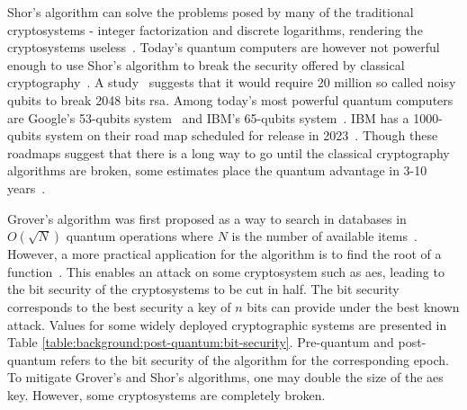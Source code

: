 Shor's algorithm can solve the problems posed by many of the traditional cryptosystems - integer factorization and discrete logarithms, rendering the cryptosystems useless~\cite{shor1997}. Today's quantum computers are however not powerful enough to use Shor's algorithm to break the security offered by classical cryptography~\cite{bernstein2017}. A study~\cite{gidney2019} suggests that it would require 20 million so called noisy \glspl{qubit} to break 2048 bits \gls{rsa}. Among today's most powerful quantum computers are Google's 53-\glspl{qubit} system~\cite{google2019:quantum-computer} and IBM's 65-\glspl{qubit} system~\cite{ibm2020:quantum-computer}. IBM has a 1000-\glspl{qubit} system on their road map scheduled for release in 2023~\cite{ibm2020:quantum-computer}. Though these roadmaps suggest that there is a long way to go until the classical cryptography algorithms are broken, some estimates place the quantum advantage in 3-10 years~\cite{ibm:z15:2019, microsoft2020}.

Grover's algorithm was first proposed as a way to search in databases in $O(\sqrt N)$ quantum operations where $N$ is the number of available items~\cite{grover1996}. However, a more practical application for the algorithm is to find the root of a function~\cite{bernstein2017}. This enables an attack on some cryptosystem such as \gls{aes}, leading to the bit security of the cryptosystems to be cut in half. The bit security corresponds to the best security a key of $n$ bits can provide under the best known attack. Values for some widely deployed cryptographic systems are presented in Table \ref{table:background:post-quantum:bit-security}. Pre-quantum and post-quantum refers to the bit security of the algorithm for the corresponding epoch. To mitigate Grover's and Shor's algorithms, one may double the size of the \gls{aes} key. However, some cryptosystems are completely broken.

